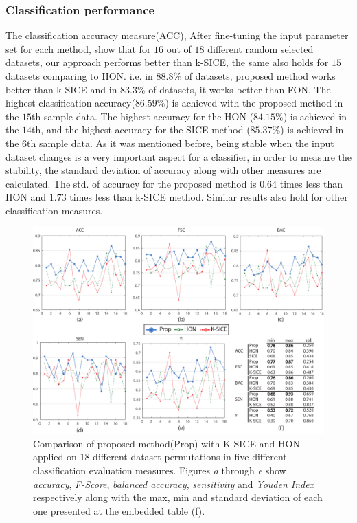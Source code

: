 \documentclass[journal]{IEEEtran}
\begin{document}
	
	\subsubsection{Classification performance}
	The classification accuracy measure(ACC), After fine-tuning the input parameter set for each method, show that for $16$ out of $18$ different random selected datasets, our approach performs better than k-SICE, the same also holds for $15$ datasets comparing to HON. i.e. in $88.8 \%$ of datasets, proposed method works better than k-SICE and in $83.3 \%$ of datasets, it works better than FON.  
	The highest classification accuracy($86.59\%$) is achieved with the proposed method in the $15$th sample data. The highest accuracy for the HON ($84.15\%$) is achieved in the $14$th, and the highest accuracy for the SICE method ($85.37\%$) is achieved in the $6$th sample data. As it was mentioned before, being stable when the input dataset changes is a very important aspect for a classifier, in order to measure the stability, the standard deviation of accuracy along with other measures are
	calculated. The std. of accuracy for the proposed method is $0.64$ times less than HON and $1.73$ times less than k-SICE method. Similar results also hold for other classification measures.
	\begin{figure}
		\centering
		\includegraphics[width=6in]{images/Final-eps.pdf}
		\caption{
			Comparison of proposed method(Prop) with K-SICE and HON 
			applied on 18 different dataset permutations 
			in five different classification evaluation measures.
			Figures \textit{a} through \textit{e} show \textit{accuracy}, \textit{F-Score}, \textit{balanced accuracy}, \textit{sensitivity} and \textit{Youden Index} respectively
			along with the max, min and standard deviation of each one presented at the embedded table (f). 
		}
		\label{g3.2}
	\end{figure}
	
\end{document}
